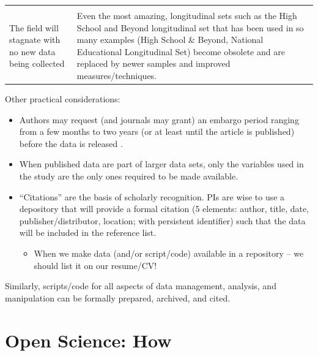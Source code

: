 \documentclass[
  english,
]{book}
\providecommand{\tightlist}{%
  \setlength{\itemsep}{0pt}\setlength{\parskip}{0pt}}
\begin{document}
\begin{longtable}[]{@{}ll@{}}
\begin{minipage}[t]{0.77\columnwidth}
\end{minipage}\tabularnewline
\begin{minipage}[t]{0.17\columnwidth}\raggedright
The field will stagnate with no new data being collected\strut
\end{minipage} & \begin{minipage}[t]{0.77\columnwidth}\raggedright
Even the most amazing, longitudinal sets such as the High School and Beyond longitudinal set that has been used in so many examples \citep{noauthor_high_nodate}(High School \& Beyond, National Educational Longitudinal Set) become obsolete and are replaced by newer samples and improved measures/techniques.\strut
\end{minipage}\tabularnewline
\bottomrule
\end{longtable}

Other practical considerations:

\begin{itemize}
\tightlist
\item
  Authors may request (and journals may grant) an embargo period ranging from a few months to two years (or at least until the article is published) before the data is released \citep{martone_data_2018}.
\item
  When published data are part of larger data sets, only the variables used in the study are the only ones required to be made available.
\item
  ``Citations'' are the basis of scholarly recognition. PIs are wise to use a depository that will provide a formal citation (5 elements: author, title, date, publisher/distributor, location; with persistent identifier) such that the data will be included in the reference list.

  \begin{itemize}
  \tightlist
  \item
    When we make data (and/or script/code) available in a repository -- we should list it on our resume/CV!
  \end{itemize}
\end{itemize}

Similarly, scripts/code for all aspects of data management, analysis, and manipulation can be formally prepared, archived, and cited.

\hypertarget{open-science-how}{%
\section{Open Science: How}\label{open-science-how}}
\end{document}
